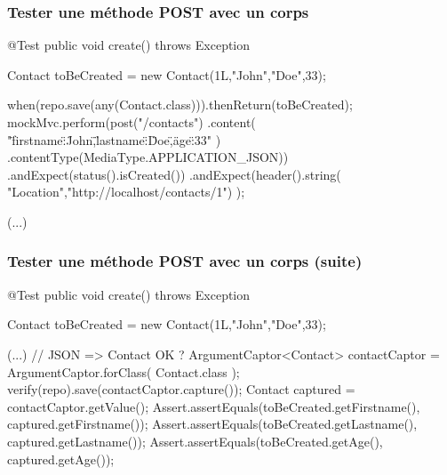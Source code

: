 \begin{frame}[fragile]
 \frametitle{Tester une méthode POST avec un corps}
 
 \begin{javacode}
@Test public void create() throws Exception {
    Contact toBeCreated = new Contact(1L,"John","Doe",33);

    when(repo.save(any(Contact.class))).thenReturn(toBeCreated);
    mockMvc.perform(post("/contacts")
        .content(
          "{\"firstname\":\"John\",\"lastname\":\"Doe\",\"age\":33}"
        )
        .contentType(MediaType.APPLICATION_JSON))
      .andExpect(status().isCreated())
      .andExpect(header().string(
         "Location","http://localhost/contacts/1")
      );

    (...)
}
 \end{javacode}

\end{frame}

\begin{frame}[fragile]
 \frametitle{Tester une méthode POST avec un corps (suite)}
 
 \begin{javacode}
@Test public void create() throws Exception {
    Contact toBeCreated = new Contact(1L,"John","Doe",33);

    (...)
    // JSON => Contact OK ?
    ArgumentCaptor<Contact> contactCaptor = ArgumentCaptor.forClass(
      Contact.class
    );
    verify(repo).save(contactCaptor.capture());
    Contact captured = contactCaptor.getValue();
    Assert.assertEquals(toBeCreated.getFirstname(),
      captured.getFirstname());
    Assert.assertEquals(toBeCreated.getLastname(),
      captured.getLastname());
    Assert.assertEquals(toBeCreated.getAge(),
      captured.getAge());
}
 \end{javacode}

\end{frame}